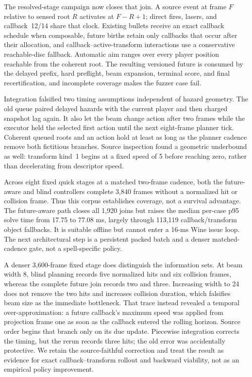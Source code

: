 \documentclass[10pt]{article}
\begin{document}
The resolved-stage campaign now closes that join.  A source event at frame
$F$ relative to sensed root $R$ activates at $F-R+1$; direct fires, lasers,
and callback~12/14 share that clock.  Existing bullets receive an exact
callback schedule when composable, future births retain only callbacks that
occur after their allocation, and callback--active-transform interactions use
a conservative reachable-disc fallback.  Automatic aim ranges over every
player position reachable from the coherent root.  The resulting versioned
future is consumed by the delayed prefix, hard preflight, beam expansion,
terminal score, and final recertification, and incomplete coverage makes the
fuzzer case fail.

Integration falsified two timing assumptions independent of hazard geometry.
The old queue paired delayed hazards with the current player and then charged
snapshot lag again.  It also let the beam change action after two frames while
the executor held the selected first action until the next eight-frame planner
tick.  Coherent queued roots and an action hold at least as long as the planner
cadence remove both fictitious branches.  Source inspection found a geometric
underbound as well: transform kind~1 begins at a fixed speed of 5 before
reaching zero, rather than decelerating from descriptor speed.

Across eight fixed quick stages at a matched two-frame cadence, both the
future-aware and blind controllers complete 3,840 frames without a normalized
hit or collision frame.  Thus this corpus establishes coverage, not a survival
advantage.  The future-aware path closes all 1,920 joins but raises the median
per-case p95 solve time from 17.75 to 77.08 ms, largely through 113,119
callback/transform object fallbacks.  It is suitable offline but cannot enter
a 16-ms Wine issue loop.  The next architectural step is a persistent packed
batch and a denser matched-cadence gate, not a spell-specific policy.

A denser 3,600-frame fixed stage does distinguish the information sets.  At
beam width 8, blind planning records five normalized hits and six collision
frames, whereas the complete future join records two and three.  Increasing
width to 24 does not remove the two hits and increases collision duration,
which falsifies beam size as the immediate bottleneck.  That trace instead
revealed a temporal over-approximation: a future callback's maximum speed was
applied from projection frame one as soon as the callback entered the rolling
horizon.  Source order begins that branch only on its due update.  Piecewise
integration corrects the timing, but the rerun records three hits; the old
error was accidentally protective.  We retain the source-faithful correction
and treat the result as evidence for exact callback--transform rollout and
backward viability, not as an empirical policy improvement.
\end{document}
